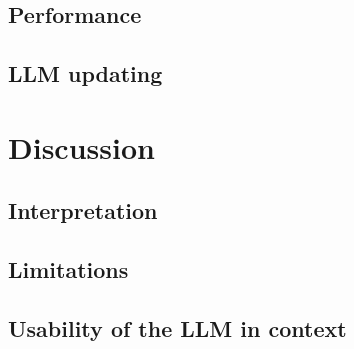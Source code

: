 \documentclass{article}
\begin{document}

\subsection{Performance}\label{sec:performance}

\subsection{LLM updating}\label{sec:llm_updating}

\section{Discussion}\label{sec:discussion}

\subsection{Interpretation}\label{sec:interpretation}

\subsection{Limitations}\label{sec:limitations}

\subsection{Usability of the LLM in context}\label{sec:usability}
\end{document}
